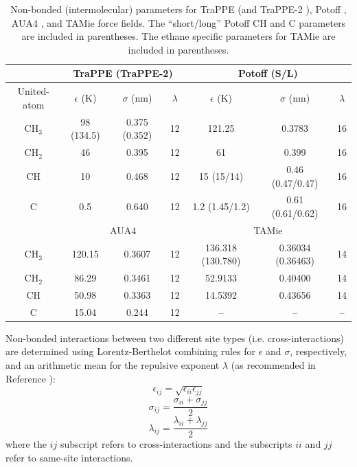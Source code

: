 \documentclass[preprint,review,12pt]{elsarticle}
\begin{document}
	\begin{table}[h!]
		\caption{Non-bonded (intermolecular) parameters for TraPPE \cite{TraPPE,Martin1999} (and TraPPE-2 \cite{TraPPEUA2}), Potoff \cite{Mie,Potoff_branched}, AUA4 \cite{AUA4,Nieto2008}, and TAMie \cite{TAMie,Weidler2016} force fields. The ``short/long'' Potoff CH and C parameters are included in parentheses. 
			The ethane specific parameters for TAMie are included in parentheses.} \label{tab:nonbonded params}
		\begin{center}
			\begin{tabular}{|c|c|c|c|c|c|c|}
				\hline
				\multicolumn{1}{|c}{} & \multicolumn{3}{|c}{TraPPE  (TraPPE-2)} & \multicolumn{3}{|c|}{Potoff (S/L)}  \\ \hline
				United-atom & $\epsilon$ (K) & $\sigma$ (nm) & $\lambda$ & $\epsilon$ (K) & $\sigma$ (nm) & $\lambda$ \\ \hline
				CH$_3$ & 98 (134.5)  & 0.375 (0.352) & 12 & 121.25 & 0.3783 & 16  \\ 
				CH$_2$ & 46 & 0.395 & 12 & 61 & 0.399 & 16 \\ 
				CH & 10 & 0.468 & 12 & 15 (15/14) & 0.46 (0.47/0.47) & 16\\
				C & 0.5 & 0.640 & 12 & 1.2 (1.45/1.2) & 0.61 (0.61/0.62) & 16\\
				\hline
				\multicolumn{1}{|c}{} & \multicolumn{3}{|c}{AUA4} & \multicolumn{3}{|c|}{TAMie} \\ \hline
				CH$_3$ & 120.15  & 0.3607 & 12 & 136.318 (130.780) & 0.36034 (0.36463) & 14 \\ 
				CH$_2$ & 86.29 & 0.3461 & 12 & 52.9133 & 0.40400 & 14 \\ 
				CH & 50.98 & 0.3363 & 12 & 14.5392 & 0.43656 & 14\\
				C & 15.04 & 0.244 & 12 & -- & -- & --\\
				\hline
			\end{tabular}
		\end{center} 
	\end{table}
	
	Non-bonded interactions between two different site types (i.e. cross-interactions) are determined using Lorentz-Berthelot combining rules \cite{Allen1987} for $\epsilon$ and $\sigma$, respectively, and an arithmetic mean for the repulsive exponent $\lambda$ (as recommended in Reference ):
	\begin{equation} \label{eq:Lorentz-Berthelot_eps}
	\epsilon_{ij} = \sqrt{\epsilon_{ii} \epsilon_{jj}}
	\end{equation}
	\begin{equation} \label{eq:Lorentz-Berthelot_sig}
	\sigma_{ij} = \frac{\sigma_{ii} + \sigma_{jj}}{2}
	\end{equation}
	\begin{equation} \label{eq:Lorentz-Berthelot_lam}
	\lambda_{ij} = \frac{\lambda_{ii} + \lambda_{jj}}{2}
	\end{equation}
	where the $ij$ subscript refers to cross-interactions and the subscripts $ii$ and $jj$ refer to same-site interactions. 
	
\end{document}

